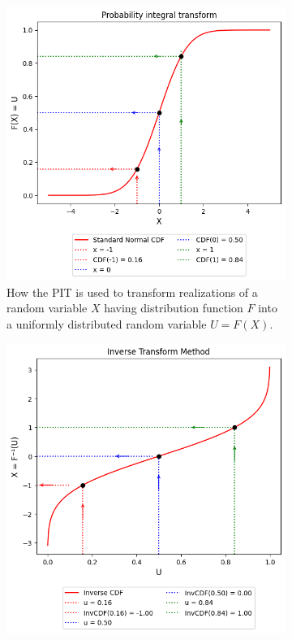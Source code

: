 \begin{figure}[h]
    \centering
    \begin{subfigure}[t]{0.471\linewidth}
        \centering
        \includegraphics[width=\linewidth]{3Theory/pictures/ProbabilityIntegralTransform.png}
        \caption{How the \gls{PIT} is used to transform realizations of a random variable $X$ having distribution function $F$ into a uniformly distributed random variable $U = F(X)$.}
        \label{fig:PIT}
    \end{subfigure}
    \hfill
    \begin{subfigure}[t]{0.45\linewidth}
        \centering
        \includegraphics[width=\linewidth]{3Theory/pictures/InverseTransformMethod.png}

\end{subfigure}
\end{figure}
